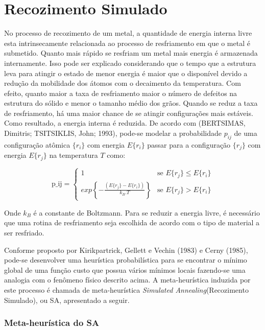\section{Recozimento Simulado}

No processo de recozimento de um metal, a quantidade de energia interna livre esta intrinsecamente
relacionada ao processo de resfriamento em que o metal é submetido. Quanto mais rápido se 
resfriam um metal mais energia é armazenada internamente. Isso pode ser explicado considerando que
o tempo que a estrutura leva para atingir o estado de menor energia é maior que o disponível devido
a redução da mobilidade dos átomos com o decaimento da temperatura. Com efeito, quanto maior a taxa de
resfriamento maior o número de defeitos na estrutura do sólido e menor o tamanho médio dos grãos.
Quando se reduz a taxa de resfriamento, há uma maior chance de se atingir configurações mais estáveis.
Como resultado, a energia interna é reduzida. De acordo com (BERTSIMAS, Dimitris; TSITSIKLIS, John; 1993),
pode-se modelar a probabilidade $p_{ij}$ de uma configuração atômica $\{r_i\}$ com energia $E\{r_i\}$ 
passar para a configuração $\{r_j\}$ com energia $E\{r_j\}$ na temperatura $T$ como:

\begin{equation}
\mbox{p_{ij}}=\left\{
	\begin{array}{rl}
	1 & \mbox{se $E\{r_j\} \le E\{r_i\}$} \\
	exp\left\{-\frac{(E\{r_j\}-E\{r_i\})}{k_B.T}\right\} & \mbox{se $E\{r_j\} > E\{r_i\}$}
\end{array} \right.
\end{equation}

Onde $k_B$ é a constante de Boltzmann. Para se reduzir a energia livre, é necessário que uma
rotina de resfriamento seja escolhida de acordo com o tipo de material a ser resfriado.

Conforme proposto por Kirikpartrick, Gellett e Vechin (1983) e Cerny (1985), pode-se desenvolver
uma heurística probabilística para se encontrar o mínimo global de uma função custo que possua
vários mínimos locais fazendo-se uma analogia com o fenômeno físico descrito acima. A meta-heurística
induzida por este processo é chamada de meta-heurística \textit{Simulated Annealing}(Recozimento 
Simulado), ou SA, apresentado a seguir.

\subsubsection{Meta-heurística do SA}

